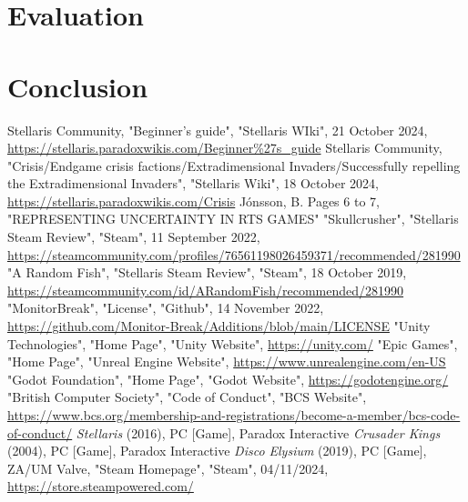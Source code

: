 \documentclass{report}
\begin{document}
\chapter{Evaluation}
\chapter{Conclusion}

\renewcommand\bibname{References}
\begin{thebibliography}{9}
Stellaris Community, "Beginner's guide", "Stellaris WIki", 21 October 2024, \href{https://stellaris.paradoxwikis.com/Beginner\%27s_guide}{https://stellaris.paradoxwikis.com/Beginner\%27s\_guide}
Stellaris Community, "Crisis/Endgame crisis factions/Extradimensional Invaders/Successfully repelling the Extradimensional Invaders", "Stellaris Wiki", 18 October 2024, \href{https://stellaris.paradoxwikis.com/Crisis#Successfully_repelling_the_Extradimensional_Invaders, Crisis Solution Link}{https://stellaris.paradoxwikis.com/Crisis}
Jónsson, B. Pages 6 to 7, "REPRESENTING UNCERTAINTY IN RTS GAMES"
"Skullcrusher", "Stellaris Steam Review", "Steam", 11 September 2022, \href{https://steamcommunity.com/profiles/76561198026459371/recommended/281990, "Review Link"}{https://steamcommunity.com/profiles/76561198026459371/recommended/281990}
"A Random Fish", "Stellaris Steam Review", "Steam", 18 October 2019, \href{https://steamcommunity.com/id/ARandomFish/recommended/281990, "Review Link"}{https://steamcommunity.com/id/ARandomFish/recommended/281990}
"MonitorBreak", "License", "Github", 14 November 2022, \href{https://github.com/Monitor-Break/Additions/blob/main/LICENSE}{https://github.com/Monitor-Break/Additions/blob/main/LICENSE}
"Unity Technologies", "Home Page", "Unity Website", \href{https://unity.com/}{https://unity.com/}
"Epic Games", "Home Page", "Unreal Engine Website", \href{https://www.unrealengine.com/en-US}{https://www.unrealengine.com/en-US}
"Godot Foundation", "Home Page", "Godot Website", \href{https://godotengine.org/}{https://godotengine.org/}
"British Computer Society", "Code of Conduct", "BCS Website", \href{https://www.bcs.org/membership-and-registrations/become-a-member/bcs-code-of-conduct/}{https://www.bcs.org/membership-and-registrations/become-a-member/bcs-code-of-conduct/}
\textit{Stellaris} (2016), PC [Game], Paradox Interactive
\textit{Crusader Kings} (2004), PC [Game], Paradox Interactive
\textit{Disco Elysium} (2019), PC [Game], ZA/UM
Valve, "Steam Homepage", "Steam", 04/11/2024, \href{https://store.steampowered.com/}{https://store.steampowered.com/}
\end{thebibliography}
\end{document}
